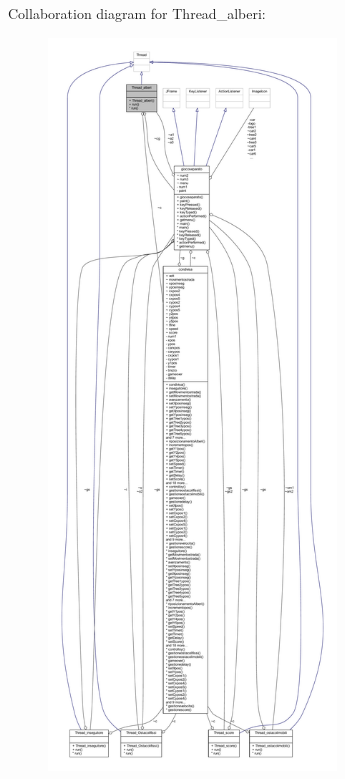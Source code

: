 Collaboration diagram for Thread\+\_\+alberi\+:
\nopagebreak
\begin{figure}[H]
\begin{center}
\leavevmode
\includegraphics[height=550pt]{classcargame_1_1_thread__alberi__coll__graph}
\end{center}
\end{figure}
